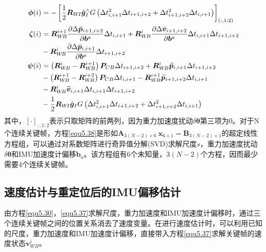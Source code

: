 \begin{equation}
\label{equ5.39}
\begin{aligned}
\boldsymbol{\phi} (i)  &= - \left[ {1 \over 2} \boldsymbol{R}_{W\!I}\hat{\boldsymbol{g}}_I^{\wedge} G \left( \Delta t_{i,i+1}^2 \Delta t_{i+1,i+2}+  \Delta t_{i+1,i+2}^2 \Delta t_{i,i+1} \right) \right]_{(:,1:2)}
\\ 
\boldsymbol{\zeta} (i) &=  \boldsymbol{R}_{W\!B}^{i+1} {\partial \Delta \bar{\boldsymbol{p}}_{i+1,i+2} \over \partial \boldsymbol{b}^a } \Delta t_{i,i+1} + \boldsymbol{R}_{W\!B}^i {\partial \Delta \bar{\boldsymbol{v}}_{i+1,i+2} \over \partial \boldsymbol{b}^a } \Delta t_{i,i+1} \Delta t_{i+1,i+2} \\
 &- \boldsymbol{R}_{W\!B}^{i} {\partial \Delta \bar{\boldsymbol{p}}_{i,i+1} \over \partial \boldsymbol{b}^a } \Delta t_{i+1,i+2} 
\\  
\boldsymbol{\psi} (i) & = \left( \boldsymbol{R}_{W\!B}^{i} - \boldsymbol{R}_{W\!B}^{i+1} \right) \boldsymbol{P}_{CB} \Delta t_{i+1,i+2} + \boldsymbol{R}_{W\!B}^{i} \widetilde{\boldsymbol{p}}_{i,i+1} \Delta t_{i+1,i+2} \\
& - \left( \boldsymbol{R}_{W\!B}^{i+1} - \boldsymbol{R}_{W\!B}^{i+2} \right) \boldsymbol{P}_{CB} \Delta t_{i,i+1} - \boldsymbol{R}_{W\!B}^{i+1} \widetilde{\boldsymbol{p}}_{i+1,i+2} \Delta t_{i,i+1} \\ 
& - \boldsymbol{R}_{W\!B}^{i} \widetilde{\boldsymbol{v}}_{i,i+1}  \Delta t_{i,i+1} \Delta t_{i+1,i+2} \\
& - {1 \over 2} \boldsymbol{R}_{W\!I} \hat{\boldsymbol{g}}_I G \left( \Delta t_{i,i+1}^2 \Delta t_{i+1,i+2} + \Delta t_{i+1,i+2}^2 \Delta t_{i,i+1} \right)
\end{aligned}
\end{equation}
其中，$[\cdot]_{:,1:2}$表示只取矩阵的前两列，因为重力加速度扰动$\delta \boldsymbol{\theta}$第三项为0。对于N个连续关键帧，方程\eqref{equ5.38}是形如$\boldsymbol{A}_{3(N-2)\times 6}\  \boldsymbol{x}_{6\times 1} = \boldsymbol{B}_{3(N-2)\times 1}$的超定线性方程组，可以通过对系数矩阵进行奇异值分解(SVD)求解尺度$s$，重力加速度扰动$\delta \boldsymbol{\theta}$和IMU加速度计偏移$\boldsymbol{b}_a$。该方程组有6个未知量，$3(N-2)$个方程，因而最少需要4个连续关键帧。


\subsection{速度估计与重定位后的IMU偏移估计}
由方程\eqref{equ5.30}，\eqref{equ5.37}求解尺度，重力加速度和IMU加速度计偏移时，通过三个连续关键帧之间的位置关系消去了速度变量。在进行速度估计时，可以利用已知的尺度，重力加速度和IMU加速度计偏移，直接带入方程\eqref{equ5.37}求解关键帧的速度状态$\boldsymbol{v}_{W\!B}^i$。

